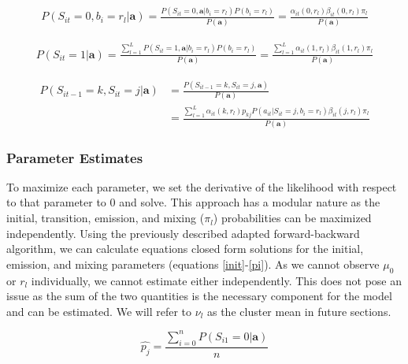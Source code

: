 \documentclass{article}
\begin{document}
\begin{equation}\label{probs0}
\begin{split}
    P(S_{it}=0,b_{i}=r_l|\textbf{a}) = \frac{P(S_{it}=0,\textbf{a}|b_{i}=r_l)
        P(b_{i}=r_l)}{P(\textbf{a})} = 
    \frac{\alpha_{it}(0,r_l)\beta_{it}(0,r_l)\pi_l }{P(\textbf{a})} 
\end{split}
\end{equation}

\begin{equation}\label{probs1}
\begin{split}
    P(S_{it}=1|\textbf{a}) = 
    \frac{\sum^L_{l=1}P(S_{it}=1,\textbf{a}|b_{i}=r_l)
        P(b_{i}=r_l)}{P(\textbf{a})} = 
    \frac{\sum^L_{l=1}\alpha_{it}(1,r_l)\beta_{it}(1,r_l)\pi_l }{P(\textbf{a})} 
\end{split}
\end{equation}


\begin{equation}\label{probstran}
\begin{split}
    P(S_{it-1}=k,S_{it}=j|\textbf{a}) & = 
        \frac{P(S_{it-1}=k,S_{it}=j,\textbf{a})}{P(\textbf{a})} \\
    & = \frac{\sum^L_{l=1}\alpha_{it}(k,r_l) p_{kj} P(a_{it}|S_{it}=j, b_i=r_l)
        \beta_{it}(j,r_l)\pi_l }{P(\textbf{a})} 
\end{split}
\end{equation}



\subsubsection{Parameter Estimates}

 To maximize each parameter, we set the derivative of the likelihood with respect to that parameter to 0 and solve. This approach has a modular nature as the initial, transition, emission, and mixing ($\pi_l$) probabilities can be maximized independently. Using the previously described adapted forward-backward algorithm, we can calculate equations closed form solutions for the initial, emission, and mixing parameters (equations \ref{init}-\ref{pi}). As we cannot observe $\mu_0$ or $r_l$ individually, we cannot estimate either independently. This does not pose an issue as the sum of the two quantities is the necessary component for the model and can be estimated. We will refer to $\nu_l$ as the cluster mean in future sections. 

\begin{equation}\label{init}
    \hat{p_j}  = \frac{\sum^n_{i=0} P(S_{i1}=0|\textbf{a})}{n}
\end{equation} 
\end{document}
